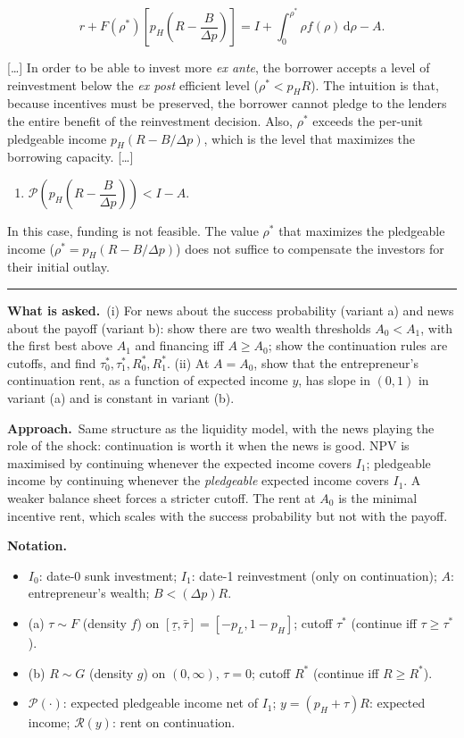 \documentclass[11pt,a4paper]{article}
\newcommand{\notation}{\par\noindent\textbf{Notation.}}
\newcommand{\asked}{\par\medskip\noindent\textbf{What is asked.}~}
\newcommand{\approach}{\par\smallskip\noindent\textbf{Approach.}~}
\providecommand{\tightlist}{\setlength{\itemsep}{0pt}\setlength{\parskip}{0pt}}
\newcommand{\stmtend}{\par\endgroup\nopagebreak\noindent\rule{\linewidth}{0.4pt}\par\medskip}
\begin{document}
\[r + F(\rho^*)\left[p_H\left(R - \frac{B}{\Delta p}\right)\right] = I + \int_0^{\rho^*}\rho f(\rho)\,\mathrm{d}\rho - A.\]

{[}\ldots{]} In order to be able to invest more \emph{ex ante}, the borrower accepts a level of
reinvestment below the \emph{ex post} efficient level (\(\rho^* < p_HR\)). The intuition is that,
because incentives must be preserved, the borrower cannot pledge to the lenders the entire benefit
of the reinvestment decision. Also, \(\rho^*\) exceeds the per-unit pledgeable income
\(p_H(R - B/\Delta p)\), which is the level that maximizes the borrowing capacity. {[}\ldots{]}

\begin{enumerate}
\def\labelenumi{(\roman{enumi})}
\setcounter{enumi}{2}
\tightlist
\item
  \(\mathcal{P}\left(p_H\left(R - \dfrac{B}{\Delta p}\right)\right) < I - A\).
\end{enumerate}

In this case, funding is not feasible. The value \(\rho^*\) that maximizes the pledgeable income
(\(\rho^* = p_H(R - B/\Delta p)\)) does not suffice to compensate the investors for their initial
outlay.
\stmtend

\asked (i) For news about the success probability (variant a) and news about the payoff (variant b): show there are two wealth thresholds $A_0<A_1$, with the first best above $A_1$ and financing iff $A\ge A_0$; show the continuation rules are cutoffs, and find $\tau_0^*,\tau_1^*,R_0^*,R_1^*$. (ii) At $A=A_0$, show that the entrepreneur's continuation rent, as a function of expected income $y$, has slope in $(0,1)$ in variant (a) and is constant in variant (b).

\approach Same structure as the liquidity model, with the news playing the role of the shock: continuation is worth it when the news is good. NPV is maximised by continuing whenever the expected income covers $I_1$; pledgeable income by continuing whenever the \emph{pledgeable} expected income covers $I_1$. A weaker balance sheet forces a stricter cutoff. The rent at $A_0$ is the minimal incentive rent, which scales with the success probability but not with the payoff.

\notation
\begin{itemize}
  \item $I_0$: date-0 sunk investment; $I_1$: date-1 reinvestment (only on continuation); $A$: entrepreneur's wealth; $B<(\Delta p)R$.
  \item (a) $\tau\sim F$ (density $f$) on $[\underline\tau,\bar\tau]=[-p_L,1-p_H]$; cutoff $\tau^*$ (continue iff $\tau\ge\tau^*$).
  \item (b) $R\sim G$ (density $g$) on $(0,\infty)$, $\tau=0$; cutoff $R^*$ (continue iff $R\ge R^*$).
  \item $\mathcal P(\cdot)$: expected pledgeable income net of $I_1$; $y=(p_H+\tau)R$: expected income; $\mathcal R(y)$: rent on continuation.
\end{itemize}
\end{document}
